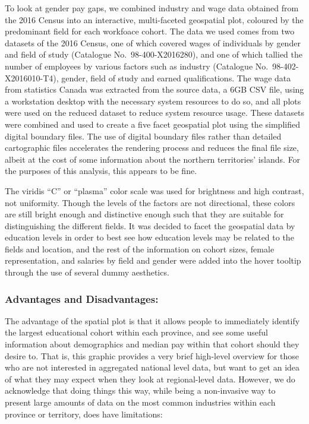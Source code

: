 \documentclass[]{article}
\begin{document}
To look at gender pay gaps, we combined industry and wage data obtained
from the 2016 Census into an interactive, multi-faceted geospatial plot,
coloured by the predominant field for each workfoace cohort. The data we
used comes from two datasets of the 2016 Census, one of which covered
wages of individuals by gender and field of study (Catalogue
No.~98-400-X2016280), and one of which tallied the number of employees
by various factors such as industry (Catalogue No.~98-402-X2016010-T4),
gender, field of study and earned qualifications. The wage data from
statistics Canada was extracted from the source data, a 6GB CSV file,
using a workstation desktop with the necessary system resources to do
so, and all plots were used on the reduced dataset to reduce system
resource usage. These datasets were combined and used to create a five
facet geospatial plot using the simplified digital boundary files. The
use of digital boundary files rather than detailed cartographic files
accelerates the rendering process and reduces the final file size,
albeit at the cost of some information about the northern territories'
islands. For the purposes of this analysis, this appears to be fine.

The viridis ``C'' or ``plasma'' color scale was used for brightness and
high contrast, not uniformity. Though the levels of the factors are not
directional, these colors are still bright enough and distinctive enough
such that they are suitable for distinguishing the different fields. It
was decided to facet the geospatial data by education levels in order to
best see how education levels may be related to the fields and location,
and the rest of the information on cohort sizes, female representation,
and salaries by field and gender were added into the hover tooltip
through the use of several dummy aesthetics.

\hypertarget{advantages-and-disadvantages}{%
\subsubsection{Advantages and
Disadvantages:}\label{advantages-and-disadvantages}}

The advantage of the spatial plot is that it allows people to
immediately identify the largest educational cohort within each
province, and see some useful information about demographics and median
pay within that cohort should they desire to. That is, this graphic
provides a very brief high-level overview for those who are not
interested in aggregated national level data, but want to get an idea of
what they may expect when they look at regional-level data. However, we
do acknowledge that doing things this way, while being a non-invasive
way to present large amounts of data on the most common industries
within each province or territory, does have limitations:
\end{document}
